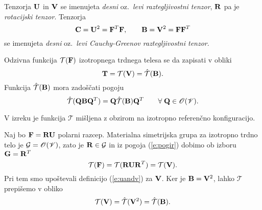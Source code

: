 Tenzorja $\mathbf U$ in $\mathbf V$ se imenujeta \emph{desni} oz.~\emph{levi raztegljivostni
tenzor}, $\mathbf R$ pa je \emph{rotacijski tenzor}. Tenzorja
\[
	\mathbf C=\mathbf U^2=\mathbf F^T\mathbf F,\qquad\mathbf B=\mathbf V^2=\mathbf F\mathbf F^T
\]
se imenujeta \emph{desni} oz.~\emph{levi Cauchy-Greenov raztegljivostni tenzor}.

\begin{izrek}
	Odzivna funkcija $\mathcal{T}(\mathbf F)$ izotropnega trdnega telesa se
	da zapisati v obliki
	\[
		\mathbf T=\mathcal{T}(\mathbf V)=\hat{\mathcal{T}}(\mathbf B).
	\]
	Funkcija $\hat{\mathcal{T}}(\mathbf B)$ mora zadoščati pogoju
	\[
		\hat{\mathcal{T}}(\mathbf Q\mathbf B\mathbf Q^T)=\mathbf Q\hat{\mathcal{T}}(\mathbf B)\mathbf Q^T
		\qquad\forall\;\mathbf Q\in\mathscr{O}(\mathscr V).
	\]
\end{izrek}

V izreku je funkcija $\mathcal{T}$ mišljena z obzirom na izotropno referenčno konfiguracijo.

\proof
	Naj bo $\mathbf F=\mathbf R\mathbf U$ polarni razcep. Materialna simetrijska grupa za izotropno
	trdno telo je $\mathcal{G}=\mathscr{O}(\mathscr V)$, zato je $\mathbf R\in\mathcal{G}$
	in iz pogoja (\ref{e:pogir}) dobimo ob izboru $\mathbf G=\mathbf R^T$
	\[
		\mathcal{T}(\mathbf F)=\mathcal{T}(\mathbf R\mathbf U\mathbf R^T)=\mathcal{T}(\mathbf V).
	\]
	Pri tem smo upoštevali definicijo (\ref{e:uandv}) za $\mathbf V$. Ker je $\mathbf B=\mathbf V^2$,
	lahko $\mathcal{T}$ prepišemo v obliko
	\[
		\mathcal{T}(\mathbf V)=\hat{\mathcal{T}}(\mathbf V^2)=\hat{\mathcal{T}}(\mathbf B).
	\]
	
	
	
\endproof